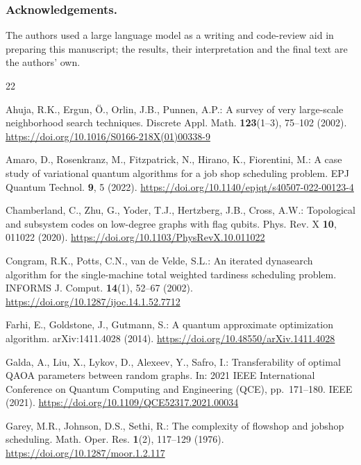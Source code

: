 \documentclass{svproc}
\newif\ifblind
\begin{document}
\ifblind\else
\subsubsection{Acknowledgements.}
The authors used a large language model as a writing and code-review aid in
preparing this manuscript; the results, their interpretation and the final
text are the authors' own.
\fi

\begin{thebibliography}{22}

Ahuja, R.K., Ergun, \"{O}., Orlin, J.B., Punnen, A.P.: A survey of very
large-scale neighborhood search techniques. Discrete Appl. Math.
\textbf{123}(1--3), 75--102 (2002).
\url{https://doi.org/10.1016/S0166-218X(01)00338-9}

Amaro, D., Rosenkranz, M., Fitzpatrick, N., Hirano, K., Fiorentini, M.:
A case study of variational quantum algorithms for a job shop scheduling
problem. EPJ Quantum Technol. \textbf{9}, 5 (2022).
\url{https://doi.org/10.1140/epjqt/s40507-022-00123-4}

Chamberland, C., Zhu, G., Yoder, T.J., Hertzberg, J.B., Cross, A.W.:
Topological and subsystem codes on low-degree graphs with flag qubits.
Phys. Rev. X \textbf{10}, 011022 (2020).
\url{https://doi.org/10.1103/PhysRevX.10.011022}

Congram, R.K., Potts, C.N., van de Velde, S.L.: An iterated dynasearch
algorithm for the single-machine total weighted tardiness scheduling
problem. INFORMS J. Comput. \textbf{14}(1), 52--67 (2002).
\url{https://doi.org/10.1287/ijoc.14.1.52.7712}

Farhi, E., Goldstone, J., Gutmann, S.: A quantum approximate
optimization algorithm. arXiv:1411.4028 (2014).
\url{https://doi.org/10.48550/arXiv.1411.4028}

Galda, A., Liu, X., Lykov, D., Alexeev, Y., Safro, I.: Transferability of
optimal QAOA parameters between random graphs. In: 2021 IEEE
International Conference on Quantum Computing and Engineering (QCE),
pp.\ 171--180. IEEE (2021).
\url{https://doi.org/10.1109/QCE52317.2021.00034}

Garey, M.R., Johnson, D.S., Sethi, R.: The complexity of flowshop and
jobshop scheduling. Math. Oper. Res. \textbf{1}(2), 117--129 (1976).
\url{https://doi.org/10.1287/moor.1.2.117}


\end{thebibliography}
\end{document}
